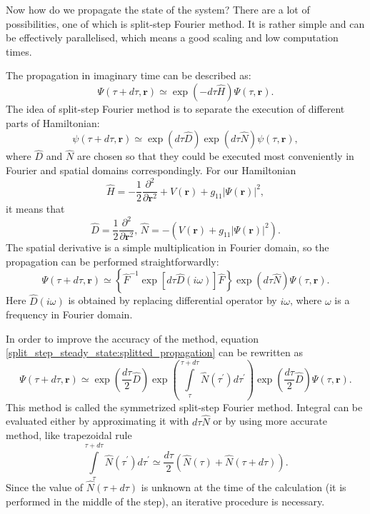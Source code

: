 \documentclass[12pt,notitlepage]{report}
\begin{document}
Now how do we propagate the state of the system? There are a lot of possibilities, one of which is split-step Fourier method. It is rather simple and can be effectively parallelised, which means a good scaling and low computation times. 

The propagation in imaginary time can be described as:
\[ \Psi(\tau + d\tau, \mathbf{r}) \simeq \exp ( -d\tau \hat{H} ) \Psi(\tau, \mathbf{r}). \]
The idea of split-step Fourier method is to separate the execution of different parts of Hamiltonian:
\begin{equation}
\label{split_step_steady_state:splitted_propagation}
\psi(\tau + d\tau, \mathbf{r}) \simeq \exp(d\tau \hat{D}) \exp(d\tau \hat{N}) \psi(\tau, \mathbf{r}),
\end{equation}
where $\hat{D}$ and $\hat{N}$ are chosen so that they could be executed most conveniently in Fourier and spatial domains correspondingly. For our Hamiltonian
\[ 
\hat{H} = -\frac{1}{2} \frac{\partial^2}{\partial \mathbf{r}^2} +
V(\mathbf{r}) + g_{11} \vert \Psi(\mathbf{r}) \vert^2,
\]
it means that
\[
\hat{D} = \frac{1}{2} \frac{\partial^2}{\partial \mathbf{r}^2},\,
\hat{N} = -\left( V(\mathbf{r}) + g_{11} \vert \Psi(\mathbf{r}) \vert^2 \right).
\]
The spatial derivative is a simple multiplication in Fourier domain, so the propagation can be performed straightforwardly:
\[
\Psi(\tau + d\tau, \mathbf{r}) \simeq \left\{ \hat{F}^{-1} \exp \left[ d\tau \hat{D}(i\omega) \right] \hat{F} \right\}
\exp(d\tau \hat{N}) \Psi(\tau, \mathbf{r}).
\]
Here $\hat{D}(i\omega)$ is obtained by replacing differential operator by $i \omega$, where $\omega$ is a frequency in Fourier domain.

In order to improve the accuracy of the method, equation \ref{split_step_steady_state:splitted_propagation} can be rewritten as
\[
\Psi(\tau + d\tau, \mathbf{r}) \simeq \exp \left( \frac{d\tau}{2} \hat{D} \right)
\exp \left( \int\limits^{\tau + d\tau}_\tau \hat{N} (\tau^\prime) d\tau^\prime \right)
\exp \left( \frac{d\tau}{2} \hat{D} \right) \Psi(\tau, \mathbf{r}).
\]
This method is called the symmetrized split-step Fourier method. Integral can be evaluated either by approximating it with $d\tau\hat{N}$ or by using more accurate method, like trapezoidal rule
\[
\int\limits^{\tau + d\tau}_\tau \hat{N} (\tau^\prime) d\tau^\prime \simeq
\frac{d\tau}{2} \left( \hat{N}(\tau) + \hat{N}(\tau + d\tau) \right).
\]
Since the value of $\hat{N}(\tau + d\tau)$ is unknown at the time of the calculation (it is performed in the middle of the step), an iterative procedure is necessary.
\end{document}
